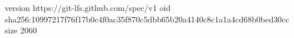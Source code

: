 version https://git-lfs.github.com/spec/v1
oid sha256:10997217f76f17b0c4f0ac35f870c5dbb65b20a4140c8c1a1a4cd68b0bed30cc
size 2060
